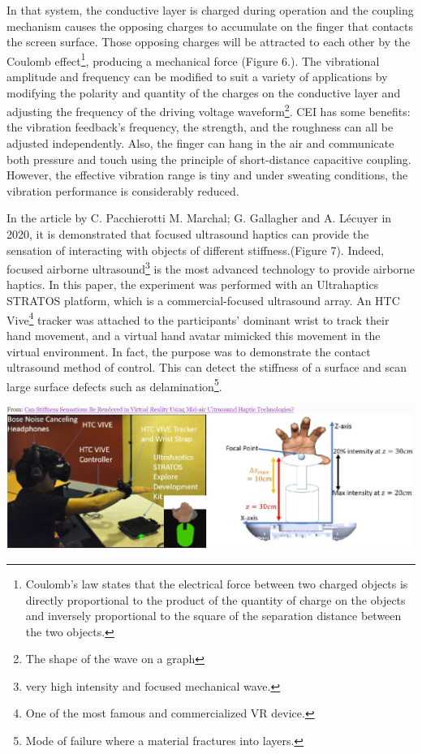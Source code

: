 \documentclass[12pt, a4paper]{article}
\begin{document}
\begin{multicols}{2}
\par In that system, the conductive layer is charged during operation and the coupling mechanism causes the opposing charges to accumulate on the finger that contacts the screen surface. Those opposing charges will be attracted to each other by the Coulomb effect\footnote{Coulomb's law states that the electrical force between two charged objects is directly proportional to the product of the quantity of charge on the objects and inversely proportional to the square of the separation distance between the two objects.}, producing a mechanical force (Figure 6.). The vibrational amplitude and frequency can be modified to suit a variety of applications by modifying the polarity and quantity of the charges on the conductive layer and adjusting the frequency of the driving voltage waveform\footnote{The shape of the wave on a graph}. CEI has some benefits: the vibration feedback's frequency, the strength, and the roughness can all be adjusted independently. Also, the finger can hang in the air and communicate both pressure and touch using the principle of short-distance capacitive coupling. However, the effective vibration range is tiny and under sweating conditions, the vibration performance is considerably reduced\cite{TBHMI}.
\par In the article by C. Pacchierotti M. Marchal; G. Gallagher and A. Lécuyer in 2020\cite{virtualReal}, it is demonstrated that focused ultrasound haptics can provide the sensation of interacting with objects of different stiffness.(Figure 7). Indeed, focused airborne ultrasound\footnote{very high intensity and focused mechanical wave.} is the most advanced technology to provide airborne haptics. In this paper, the experiment was performed with an Ultrahaptics STRATOS platform, which is a commercial-focused ultrasound array. An HTC Vive\footnote{One of the most famous and commercialized VR device.} tracker was attached to the participants' dominant wrist to track their hand movement, and a virtual hand avatar mimicked this movement in the virtual environment. In fact, the purpose was to demonstrate the contact ultrasound method of control. This can detect the stiffness of a surface and scan large surface defects such as delamination\footnote{Mode of failure where a material fractures into layers.}\cite{TBHMI}.

\captionsetup{type=figure}
\includegraphics[width=.49\textwidth]{ultrasonic.png}
\vspace*{3mm}


\end{multicols}
\end{document}
